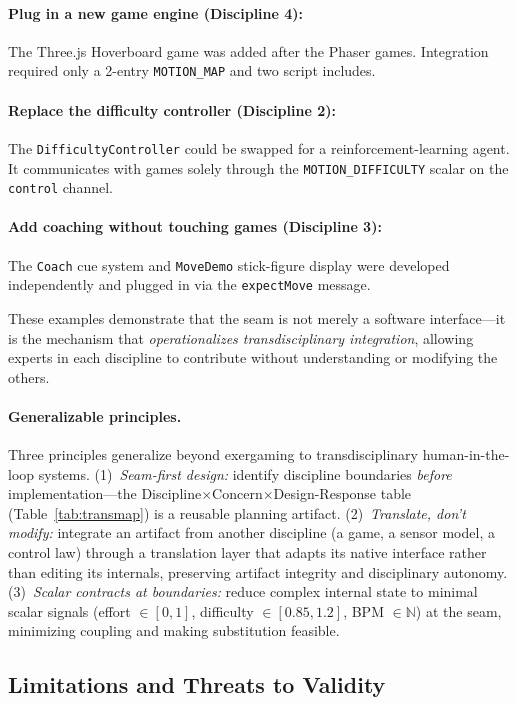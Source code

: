 \documentclass[runningheads]{llncs}
\newcommand{\motionmap}{\texttt{MOTION\_MAP}}
\begin{document}
\paragraph{Plug in a new game engine (Discipline 4):} The Three.js
Hoverboard game was added after the Phaser games. Integration
required only a 2-entry \motionmap{} and two script includes.
\paragraph{Replace the difficulty controller (Discipline 2):}
The \texttt{DifficultyController} could be swapped for a
reinforcement-learning agent. It communicates with games solely
through the \texttt{MOTION\_DIFFICULTY} scalar on the
\texttt{control} channel.
\paragraph{Add coaching without touching games (Discipline 3):}
The \texttt{Coach} cue system and \texttt{MoveDemo} stick-figure
display were developed independently and plugged in via the
\texttt{expectMove} message.

These examples demonstrate that the seam is not merely a software
interface---it is the mechanism that \emph{operationalizes
transdisciplinary integration}, allowing experts in each discipline to
contribute without understanding or modifying the others.

\paragraph{Generalizable principles.}
Three principles generalize beyond exergaming to transdisciplinary
human-in-the-loop systems. (1)~\emph{Seam-first design:} identify discipline
boundaries \emph{before} implementation---the
Discipline$\times$Concern$\times$Design-Response table
(Table~\ref{tab:transmap}) is a reusable planning artifact. (2)~\emph{Translate,
don't modify:} integrate an artifact from another discipline (a game, a sensor
model, a control law) through a translation layer that adapts its native
interface rather than editing its internals, preserving artifact integrity and
disciplinary autonomy. (3)~\emph{Scalar contracts at boundaries:} reduce complex
internal state to minimal scalar signals (effort $\in [0,1]$, difficulty
$\in [0.85,1.2]$, BPM $\in \mathbb{N}$) at the seam, minimizing coupling and
making substitution feasible.

\subsection{Limitations and Threats to Validity}
\end{document}
